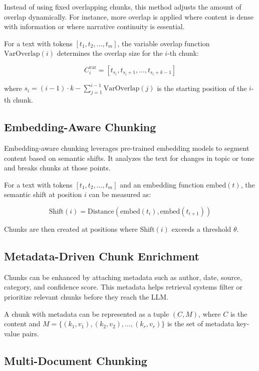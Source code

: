 \documentclass{article}
\begin{document}
Instead of using fixed overlapping chunks, this method adjusts the amount of overlap dynamically. For instance, more overlap is applied where content is dense with information or where narrative continuity is essential.

For a text with tokens $[t_1, t_2, \ldots, t_m]$, the variable overlap function $\textrm{VarOverlap}(i)$ determines the overlap size for the $i$-th chunk:

\begin{equation}
C_i^{\textrm{var}} = [t_{s_i}, t_{s_i + 1}, \ldots, t_{s_i + k - 1}]
\end{equation}

where $s_i = (i-1) \cdot k - \sum_{j=1}^{i-1} \textrm{VarOverlap}(j)$ is the starting position of the $i$-th chunk.

\subsection{Embedding-Aware Chunking}

Embedding-aware chunking leverages pre-trained embedding models to segment content based on semantic shifts. It analyzes the text for changes in topic or tone and breaks chunks at those points.

For a text with tokens $[t_1, t_2, \ldots, t_m]$ and an embedding function $\textrm{embed}(t)$, the semantic shift at position $i$ can be measured as:

\begin{equation}
\textrm{Shift}(i) = \textrm{Distance}(\textrm{embed}(t_i), \textrm{embed}(t_{i+1}))
\end{equation}

Chunks are then created at positions where $\textrm{Shift}(i)$ exceeds a threshold $\theta$.

\subsection{Metadata-Driven Chunk Enrichment}

Chunks can be enhanced by attaching metadata such as author, date, source, category, and confidence score. This metadata helps retrieval systems filter or prioritize relevant chunks before they reach the LLM.

A chunk with metadata can be represented as a tuple $(C, M)$, where $C$ is the content and $M = \{(k_1, v_1), (k_2, v_2), \ldots, (k_r, v_r)\}$ is the set of metadata key-value pairs.

\subsection{Multi-Document Chunking}
\end{document}
